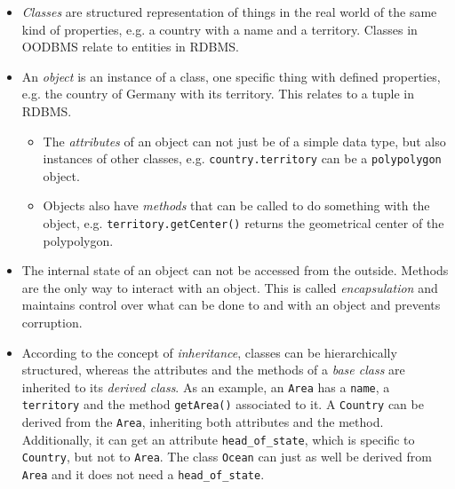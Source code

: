 \begin{itemize}
  \item \emph{Classes} are structured representation of things in the real world of the same kind of properties, e.g. a country with a name and a territory. Classes in OODBMS relate to entities in RDBMS.
  \item An \emph{object} is an instance of a class, one specific thing with defined properties, e.g. the country of Germany with its territory. This relates to a tuple in RDBMS.
  \begin{itemize}
    \item The \emph{attributes} of an object can not just be of a simple data type, but also instances of other classes, e.g. \texttt{country.territory} can be a \texttt{polypolygon} object.
    \item Objects also have \emph{methods} that can be called to do something with the object, e.g. \texttt{territory.getCenter()} returns the geometrical center of the polypolygon.
  \end{itemize}
  \item The internal state of an object can not be accessed from the outside. Methods are the only way to interact with an object. This is called \emph{encapsulation} and maintains control over what can be done to and with an object and prevents corruption.
  \item According to the concept of \emph{inheritance}, classes can be hierarchically structured, whereas the attributes and the methods of a \emph{base class} are inherited to its \emph{derived class}. As an example, an \texttt{Area} has a \texttt{name}, a \texttt{territory} and the method \texttt{getArea()} associated to it. A \texttt{Country} can be derived from the \texttt{Area}, inheriting both attributes and the method. Additionally, it can get an attribute \texttt{head\_of\_state}, which is specific to \texttt{Country}, but not to \texttt{Area}. The class \texttt{Ocean} can just as well be derived from \texttt{Area} and it does not need a \texttt{head\_of\_state}.
\end{itemize}

